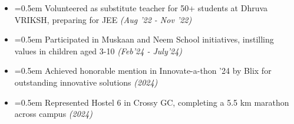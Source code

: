 \documentclass{article}
\begin{document}
    

\begin{itemize}[label=\textcolor{myblue}{\textbullet},itemsep = -1.25mm, leftmargin=5.5mm]
\item{}\font=0.5em Volunteered as substitute teacher for 50+ students at Dhruva VRIKSH, preparing for JEE \hfill{\sl \small (Aug '22 - Nov '22)}
\vspace{3pt}

\item{}\font=0.5em Participated in Muskaan and Neem School initiatives, instilling values in children aged 3-10 \hfill{\sl \small (Feb’24 - July’24)}

\vspace{3pt}

\item{}\font=0.5em Achieved honorable mention in Innovate-a-thon '24 by Blix for outstanding innovative solutions
\hfill{\sl \small (2024)}

\vspace{3pt}

\item{}\font=0.5em Represented Hostel 6 in Crossy GC, completing a 5.5 km marathon across campus
\hfill{\sl \small (2024)}

 
\end{itemize}




\end{document}
